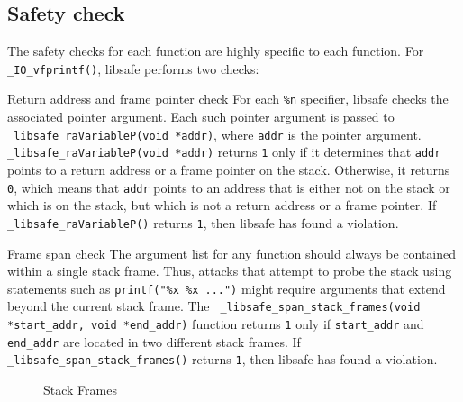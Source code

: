 \documentclass[]{article}
\begin{document}

\subsection{Safety check}
\label{subsec:safety_check}

The safety checks for each function are highly specific to each function.  For
{\tt \_IO\_vfprintf()}, libsafe performs two checks:

\begin{Lentry}
\item[Return address and frame pointer check]
    For each {\tt \%n} specifier, libsafe checks the associated pointer
    argument.  Each such pointer argument is passed to {\tt
    \_libsafe\_raVariableP(void *addr)}, where {\tt addr} is the pointer
    argument.  {\tt \_libsafe\_raVariableP(void *addr)} returns {\tt 1} only if
    it determines that {\tt addr} points to a return address or a frame pointer
    on the stack.  Otherwise, it returns {\tt 0}, which means that {\tt addr}
    points to an address that is either not on the stack or which is on the
    stack, but which is not a return address or a frame pointer.  If {\tt
    \_libsafe\_raVariableP()} returns {\tt 1}, then libsafe has found a
    violation.
\item[Frame span check]
    The argument list for any function should always be contained within a
    single stack frame.  Thus, attacks that attempt to probe the stack using
    statements such as {\tt printf("\%x \%x ...")} might require arguments that
    extend beyond the current stack frame.  The {\tt
    \_libsafe\_span\_stack\_frames(void *start\_addr, void *end\_addr)}
    function returns {\tt 1} only if {\tt start\_addr} and {\tt end\_addr} are
    located in two different stack frames.  If {\tt
    \_libsafe\_span\_stack\_frames()} returns {\tt 1}, then libsafe has found a
    violation.
\end{Lentry}

\begin{figure}[htbp]
\centerline{}
\caption{Stack Frames}
\label{fig:stack_frames}
\end{figure}
\end{document}
